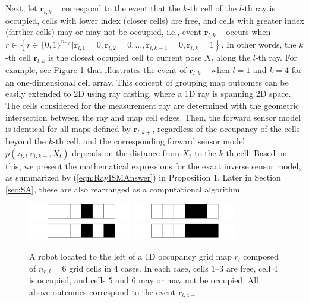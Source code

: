 \documentclass[smallextended]{svjour3}       %
\newcommand{\braces}[1]{\ensuremath{\left\{ #1 \right\}}}
\newcommand{\refeqn}[1]{(\ref{eqn:#1})}
\begin{document}
Next, let $\mathbf{r}_{l,k+}$ correspond to the event that the $k$-th cell of the $l$-th ray is occupied, cells with lower index (closer cells) are free, and cells with greater index (farther cells) may or may not be occupied, i.e., event $\mathbf{r}_{l,k+}$ occurs when \\$r\in\braces{r\in\{0,1\}^{{n_{r,l}}}\,|\mathbf{r}_{l,1}=0,\mathbf{r}_{l,2}=0,\ldots,\mathbf{r}_{l,k-1}=0,\mathbf{r}_{l,k}=1}$. In other words, the $k$-th cell $\mathbf{r}_{l,k}$ is the closest occupied cell to current pose $X_t$ along the $l$-th ray. For example, see Figure \ref{fig:show_rkplus} that illustrates the event of $\mathbf{r}_{l,k+}$ when $l=1$ and $k=4$ for an one-dimensional cell array. This concept of grouping map outcomes can be easily extended to 2D using ray casting, where a 1D ray is spanning 2D space. The cells considered for the measurement ray are determined with the geometric intersection between the ray and map cell edges.
Then, the forward sensor model is identical for all maps defined by $\mathbf{r}_{l,k+}$, regardless of the occupancy of the cells beyond the $k$-th cell, and the corresponding forward sensor model $p(z_{t,l}|\mathbf{r}_{l,k+},X_{t})$ depends on the distance from $X_t$ to the $k$-th cell. Based on this, we present the mathematical expressions for the exact inverse sensor model, as summarized by \refeqn{RayISMAnswer} in Proposition 1. Later in Section \ref{sec:SA}, these are also rearranged as a computational algorithm. 



\begin{figure}
  \centering
  \includegraphics[width=0.4\textwidth]{rkplus_1.png}
    \centering
  \includegraphics[width=0.4\textwidth]{rkplus_2.png}  
  \centering
  \includegraphics[width=0.4\textwidth]{rkplus_3.png}
    \centering
  \includegraphics[width=0.4\textwidth]{rkplus_4.png}
  \caption{A robot located to the left of a 1D occupancy grid map $r_l$ composed of $n_{r,l}=6$ grid cells in $4$ cases. In each case, cells $1$--$3$ are free, cell $4$ is occupied, and cells $5$ and $6$ may or may not be occupied. All above outcomes correspond to the event $\mathbf{r}_{l,4+}$.}
  \label{fig:show_rkplus}
\end{figure}
\end{document}
